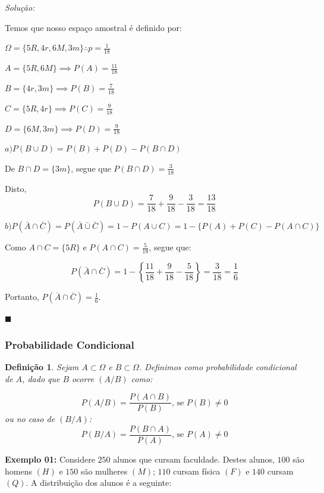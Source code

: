 \documentclass[oneside,a4paper,12pt]{article}
\newtheorem{definition}{Definição}[section]
\begin{document}
{\it Solução:}

Temos que nosso espaço amostral é definido por:

$\Omega = \{ 5R, 4r, 6M, 3m \} \therefore p = \displaystyle \frac{1}{18}$

$A = \{ 5R, 6M \} \implies P(A) = \displaystyle \frac{11}{18}$

$B = \{ 4r, 3m \} \implies P(B) = \displaystyle \frac{7}{18}$

$C = \{ 5R, 4r \} \implies P(C) = \displaystyle \frac{9}{18}$

$D = \{ 6M, 3m \} \implies P(D) = \displaystyle \frac{9}{18}$

$a) P(B \cup D) = P(B) + P(D) - P(B \cap D)$

De $B \cap D = \{3m\}$, segue que $P(B \cap D) = \displaystyle \frac{3}{18}$

Disto,
$$P(B \cup D) = \frac{7}{18} + \frac{9}{18} - \frac{3}{18} = \frac{13}{18}$$

$b) P(\bar{A} \cap \bar{C}) = P(\bar{A} \bar{\cup} \bar{C}) = 1 - P(A \cup C) = 1 - \{ P(A) + P(C) - P(A \cap C) \}$

Como $A \cap C = \{ 5R \}$ e $P(A \cap C) = \displaystyle \frac{5}{18}$, segue que:

$$P(\bar{A} \cap \bar{C}) = 1 -  \left\{ \frac{11}{18} + \frac{9}{18} - \frac{5}{18} \right\} = \frac{3}{18} = \frac{1}{6}  $$

Portanto, $P(\bar{A} \cap \bar{C}) = \displaystyle \frac{1}{6}$.

\begin{flushright}
	$\blacksquare$
\end{flushright}

\subsubsection{Probabilidade Condicional}

\begin{definition}

Sejam $A \subset \Omega$ e $B \subset \Omega$. Definimos como {\it probabilidade condicional de $A$, dado que $B$ ocorre $(A/B)$} como:

$$P(A/B) = \frac{P(A \cap B)}{P(B)} \text{, se } P(B) \neq 0$$
ou no caso de $(B/A)$:
$$P(B/A) = \frac{P(B \cap A)}{P(A)} \text{, se } P(A) \neq 0$$

\end{definition}

{\bf Exemplo 01:} Considere $250$ alunos que cursam faculdade. Destes alunos, $100$ são homens $(H)$ e $150$ são mulheres $(M)$; $110$ cursam física $(F)$ e $140$ cursam $(Q)$. A distribuição dos alunos é a seguinte:
\end{document}
